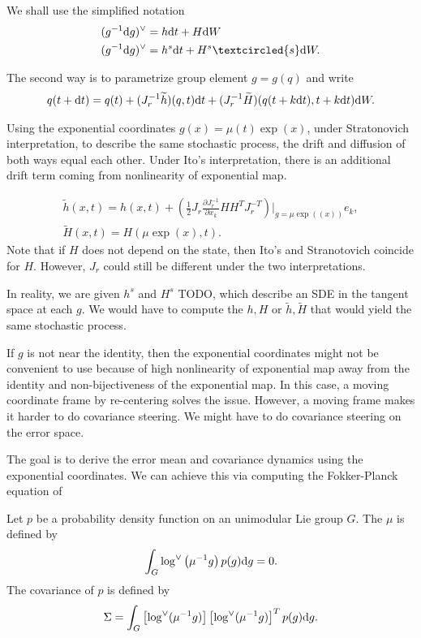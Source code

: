 \documentclass[12pt,class=article,crop=false]{standalone}
\begin{document}
We shall use the simplified notation
\begin{align*}
	(g^{-1} \d g)^\vee &= h\d t + H\d W\\
	(g^{-1} \d g)^\vee &= h^s \d t + H^s \textcircled{s} \d W .
\end{align*}


The second way is to parametrize group element $ g = g(q)$ and write
 \begin{align*}
	q(t+\mathrm{d} t) = q(t) + (J_r^{-1} \widetilde{ h})(q,t) \mathrm{d} t + (J_r^{-1} \widetilde{ H})(q(t+k\mathrm{d} t),t + k\mathrm{d} t) \mathrm{d} W .
\end{align*}

Using the exponential coordinates $ g(x) = \mu(t) \exp( x)$, under Stratonovich interpretation, to describe the same stochastic process, the drift and diffusion of both ways equal each other. Under Ito's interpretation, there is an additional drift term coming from nonlinearity of exponential map.

\begin{align*}
	\widetilde{ h}(x,t) = h(x,t) + \left( \frac{1}{2} J_r \frac{\partial J_r^{-1}}{\partial x_k} H H^{T} J_r^{-T}  \right) \bigg|_{g=\mu \exp( (x))} e_k,\\
	\widetilde{ H}(x,t) = H(\mu \exp( x),t) .
\end{align*}
Note that if $ H$ does not depend on the state, then Ito's and Stranotovich coincide for $ H$. However,  $ J_r$ could still be different under the two interpretations.

In reality, we are given $ h^s$ and  $ H^s$ TODO, which describe an SDE in the tangent space at each  $ g$. We would have to compute the $ h, H$ or  $ \widetilde{ h}, \widetilde{ H}$ that would yield the same stochastic process.


If $ g$ is not near the identity, then the exponential coordinates might not be convenient to use because of high nonlinearity of exponential map away from the identity and non-bijectiveness of the exponential map. In this case, a moving coordinate frame by re-centering solves the issue. However, a moving frame makes it harder to do covariance steering. We might have to do covariance steering on the error space.

The goal is to derive the error mean and covariance dynamics using the exponential coordinates. We can achieve this via computing the Fokker-Planck equation of 

\begin{defn}
Let $ p$ be a probability density function on an unimodular Lie group $ G$. The   $ \mu$ is defined by
\begin{align*}
	\int_G \log ^\vee \left( \mu^{-1} g \right) p(g) \mathrm{d} g = 0 .
\end{align*}
The covariance of $ p$ is defined by
 \begin{align*}
	\Sigma = \int_G \left[ \log ^\vee (\mu^{-1} g) \right] \left[ \log ^\vee (\mu^{-1}g) \right] ^{T} p(g) \mathrm{d} g .
\end{align*}
\end{defn}
\end{document}
